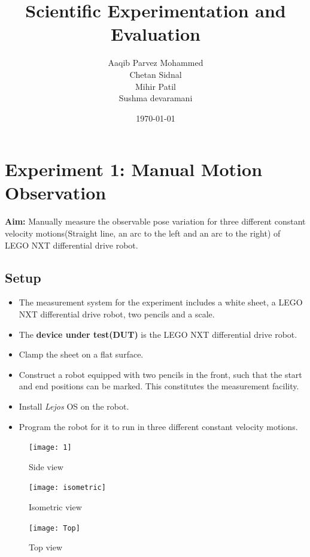 \documentclass[11pt,a4paper]{article}
\begin{document}
\title{\textbf{Scientific Experimentation and Evaluation}}
\author{Aaqib Parvez Mohammed \\ Chetan Sidnal\\ Mihir Patil \\ Sushma devaramani}
\date{\today}
\maketitle
\newpage
\tableofcontents
\newpage
\listoffigures
\newpage
\section{Experiment 1: Manual Motion Observation}
\textbf{Aim:} Manually measure the observable pose variation for three different constant velocity motions(Straight line, an arc to the left and an arc to the right) of LEGO NXT differential drive robot.

\subsection{\textbf{Setup}}
\begin{itemize}
\item The measurement system for the experiment includes a white sheet, a LEGO NXT differential drive robot, two pencils and a scale.
\item The \textbf{device under test(DUT)} is the LEGO NXT differential drive robot.
\item Clamp the sheet on a flat surface.
\item Construct a robot equipped with two pencils in the front, such that the start and end positions can be marked. This constitutes the measurement facility.
\item Install \textit{Lejos} OS on the robot.
\item Program the robot for it to run in three different constant velocity motions.
\end{itemize}

\begin{figure}[H]
\centering
  \centering
  \texttt{[image: 1]}
  \caption{Side view}
  \label{fig:side}
\end{figure}

\begin{figure}[H]
\centering
  \centering
  \texttt{[image: isometric]}
  \caption{Isometric view}
  \label{fig:iso}
\end{figure}

\begin{figure}[H]
\centering
  \centering
  \texttt{[image: Top]}
  \caption{Top view}
  \label{fig:top}
\end{figure}
\end{document}
